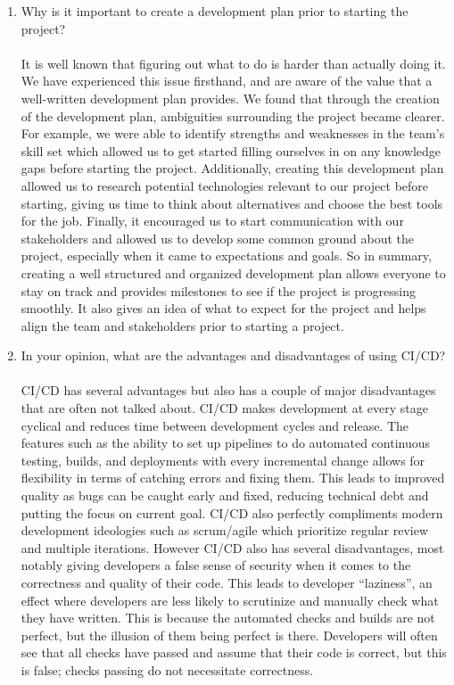 \documentclass{article}
\begin{document}
\begin{enumerate}
  \item Why is it important to create a development plan prior to starting the
    project?\\
    \\
    It is well known that figuring out what to do is harder than
    actually doing it. We have experienced this
    issue firsthand, and are aware of the value that a well-written
    development plan provides. We found
    that through the creation of the development plan, ambiguities
    surrounding the project became
    clearer. For example, we were able to identify strengths and
    weaknesses in the team’s skill set which
    allowed us to get started filling ourselves in on any knowledge
    gaps before starting the project.
    Additionally, creating this development plan allowed us to
    research potential technologies relevant to
    our project before starting, giving us time to think about
    alternatives and choose the best tools for the
    job. Finally, it encouraged us to start communication with our
    stakeholders and allowed us to develop
    some common ground about the project, especially when it came to
    expectations and goals. So in
    summary, creating a well structured and organized development
    plan allows everyone to stay on track
    and provides milestones to see if the project is progressing
    smoothly. It also gives an idea of what to
    expect for the project and helps align the team and stakeholders
    prior to starting a project.

  \item In your opinion, what are the advantages and disadvantages of using
    CI/CD?\\
    \\
    CI/CD has several advantages but also has a couple of major
    disadvantages that are often not talked
    about. CI/CD makes development at every stage cyclical and
    reduces time between development cycles
    and release. The features such as the ability to set up pipelines
    to do automated continuous testing,
    builds, and deployments with every incremental change allows for
    flexibility in terms of catching errors
    and fixing them. This leads to improved quality as bugs can be
    caught early and fixed, reducing
    technical debt and putting the focus on current goal. CI/CD also
    perfectly compliments modern
    development ideologies such as scrum/agile which prioritize
    regular review and multiple iterations.
    However CI/CD also has several disadvantages, most notably giving
    developers a false sense of security
    when it comes to the correctness and quality of their code. This
    leads to developer “laziness”, an effect
    where developers are less likely to scrutinize and manually check
    what they have written. This is
    because the automated checks and builds are not perfect, but the
    illusion of them being perfect is
    there. Developers will often see that all checks have passed and
    assume that their code is correct, but
    this is false; checks passing do not necessitate correctness.


\end{enumerate}
\end{document}

